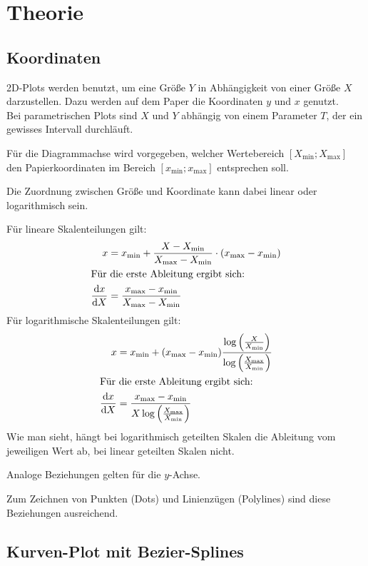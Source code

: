 \documentclass[ngerman,origlongtable]{scrartcl}
\begin{document}
\section{Theorie}
\subsection{Koordinaten}
2D-Plots werden benutzt, um eine Größe \(Y\) in Abhängigkeit von einer
Größe \(X\) darzustellen. Dazu werden auf dem Paper die Koordinaten
\(y\) und \(x\) genutzt.\\
Bei parametrischen Plots sind \(X\) und \(Y\) abhängig von einem Parameter
\(T\), der ein gewisses Intervall durchläuft.

Für die Diagrammachse wird vorgegeben, welcher Wertebereich
\([X_{\text{min}};X_{\text{max}}]\) den Papierkoordinaten im Bereich
\([x_{\text{min}};x_{\text{max}}]\) entsprechen soll.

Die Zuordnung zwischen Größe und Koordinate kann dabei linear
oder logarithmisch sein.

Für lineare Skalenteilungen gilt:
\begin{align*}
x&=x_{\text{min}}+\frac{X-X_{\text{min}}}{X_{\text{max}}-X_{\text{min}}}\cdot{}(x_{\text{max}}-x_{\text{min}})\\
\intertext{Für die erste Ableitung ergibt sich:}
\frac{\mathrm{d} x}{\mathrm{d} X}&=\frac{x_{\text{max}}-x_{\text{min}}}{X_{\text{max}}-X_{\text{min}}}\end{align*}
Für logarithmische Skalenteilungen gilt:
\begin{align*}
x&=x_{\text{min}}+(x_{\text{max}}-x_{\text{min}})\frac{\log{\left(\frac{X}{X_{\text{min}}}\right)}}{\log{\left(\frac{X_{\text{max}}}{X_{\text{min}}}\right)}}\\
\intertext{Für die erste Ableitung ergibt sich:}
\frac{\mathrm{d} x}{\mathrm{d} X}&=\frac{x_{\text{max}}-x_{\text{min}}}{X\log{\left(\frac{X_{\text{max}}}{X_{\text{min}}}\right)}}
\end{align*}
Wie man sieht, hängt bei logarithmisch geteilten Skalen die Ableitung
vom jeweiligen Wert ab, bei linear geteilten Skalen nicht.

Analoge Beziehungen gelten für die \(y\)-Achse.

Zum Zeichnen von Punkten (Dots) und Linienzügen (Polylines) sind diese
Beziehungen ausreichend.
\clearpage
\subsection{Kurven-Plot mit Bezier-Splines}
\end{document}
